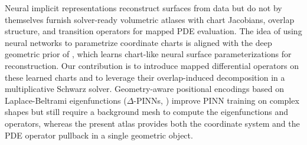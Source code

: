 \documentclass[sort&compress]{svjour3} %
\begin{document}
Neural implicit representations \citep{park2019deepsdf,mescheder2019occupancy} reconstruct surfaces from data but do not by themselves furnish solver-ready volumetric atlases with chart Jacobians, overlap structure, and transition operators for mapped PDE evaluation. The idea of using neural networks to parametrize coordinate charts is aligned with the deep geometric prior of \citet{williams2019deep}, which learns chart-like neural surface parameterizations for reconstruction. Our contribution is to introduce mapped differential operators on these learned charts and to leverage their overlap-induced decomposition in a multiplicative Schwarz solver. Geometry-aware positional encodings based on Laplace-Beltrami eigenfunctions ($\Delta$-PINNs, \citealt{sahli2024deltapinns}) improve PINN training on complex shapes but still require a background mesh to compute the eigenfunctions and operators, whereas the present atlas provides both the coordinate system and the PDE operator pullback in a single geometric object. 
\end{document}
